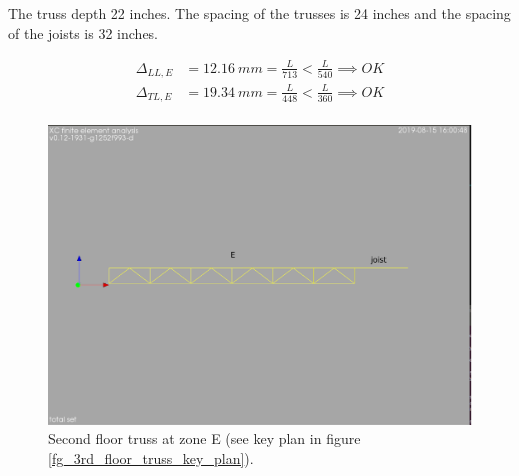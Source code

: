 \noindent The truss depth 22 inches. The spacing of the trusses is 24 inches and the spacing of the joists is 32 inches.

\begin{align}
\Delta_{LL,E} &= 12.16\ mm= \frac{L}{713} < \frac{L}{540} \implies OK \\
\Delta_{TL,E} &= 19.34\ mm= \frac{L}{448} < \frac{L}{360} \implies OK \\
\end{align}


\begin{figure}
  \begin{center}
  \includegraphics[width=120mm]{figures/2nd_floor_truss_E}
  \end{center}
  \caption{Second floor truss at zone E (see key plan in figure \ref{fg_3rd_floor_truss_key_plan}).}\label{fg_2nd_floor_truss_E}
\end{figure}
